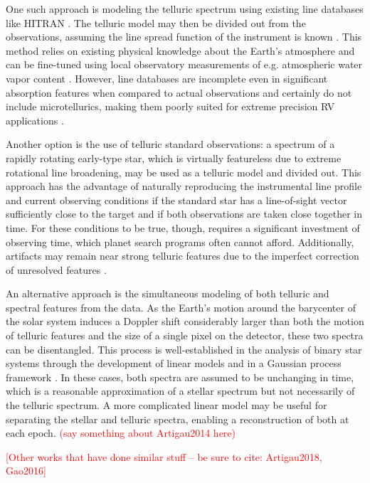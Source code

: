 \documentclass[twocolumn]{aastex62}
\newcommand{\todo}[1]{\textcolor{red}{#1}}  %
\newcommand{\acronym}[1]{{\small{#1}}}
\begin{document}
One such approach is modeling the telluric spectrum using existing line databases like \acronym{HITRAN} \citep{HITRAN2016}. 
The telluric model may then be divided out from the observations, assuming the line spread function of the instrument is known \citep[e.g.][]{Seifahrt2010}. 
This method relies on existing physical knowledge about the Earth's atmosphere and can be fine-tuned using local observatory measurements of e.g. atmospheric water vapor content \citep{Baker2017}. 
However, line databases are incomplete even in significant absorption features when compared to actual observations and certainly do not include microtellurics, making them poorly suited for extreme precision RV applications \citep{Bertaux2014}.

Another option is the use of telluric standard observations: a spectrum of a rapidly rotating early-type star, which is virtually featureless due to extreme rotational line broadening, may be used as a telluric model and divided out. 
This approach has the advantage of naturally reproducing the instrumental line profile and current observing conditions if the standard star has a line-of-sight vector sufficiently close to the target and if both observations are taken close together in time. 
For these conditions to be true, though, requires a significant investment of observing time, which planet search programs often cannot afford. 
Additionally, artifacts may remain near strong telluric features due to the imperfect correction of unresolved features \citep{Bailey2007}.

An alternative approach is the simultaneous modeling of both telluric and spectral features from the data. 
As the Earth's motion around the barycenter of the solar system induces a Doppler shift considerably larger than both the motion of telluric features and the size of a single pixel on the detector, these two spectra can be disentangled.
This process is well-established in the analysis of binary star systems through the development of linear models
\citep[e.g.][]{Simon1994} and in a Gaussian process framework \citep{Czekala2017}.
In these cases, both spectra are assumed to be unchanging in time, which is a reasonable approximation of a stellar spectrum but not necessarily of the telluric spectrum.
A more complicated linear model may be useful for separating the stellar and telluric spectra, enabling a reconstruction of both at each epoch.
\todo{(say something about Artigau2014 here)} 

\todo{[Other works that have done similar stuff -- be sure to cite: Artigau2018, Gao2016]}
\end{document}
